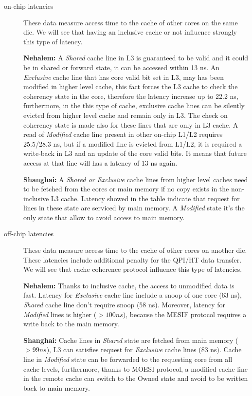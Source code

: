 \begin{description} %

\item[on-chip latencies] These data measure access time to the cache of other cores on the same die. We will see that having an inclusive cache or not
influence strongly this type of latency. 

\textbf{Nehalem:} A \textit{Shared} cache line in L3 is guaranteed to be valid and it could be in shared or forward state, it can be accessed within 13 ns. 
An \textit{Exclusive} cache line that has core valid bit set in L3, may has been modified in higher level cache, this fact forces the L3 cache to check the 
coherency state in the core, therefore the latency increase up to 22.2 ns, furthermore, in the this type of cache, exclusive cache lines can be silently 
evicted from higher level cache and remain only in L3. The check on coherency state is made also for these lines that are only in L3 cache.
A read of \textit{Modified} cache line present in other on-chip L1/L2 requires 25.5/28.3 ns, but if a modified line is evicted from L1/L2, it is required a 
write-back in L3 and an update of the core valid bits. It means that future access at that line will has a latency of 13 ns again.

\textbf{Shanghai:} A \textit{Shared or Exclusive} cache lines from higher level caches need to be fetched from the cores or main memory if no copy exists 
in the non-inclusive L3 cache. Latency showed in the table indicate that request for lines in these state are serviced by main memory.
A \textit{Modified} state it's the only state that allow to avoid access to main memory.

\item[off-chip latencies] These data measure access time to the cache of other cores on another die. These latencies include additional penalty for the
QPI/HT data transfer. We will see that cache coherence protocol influence this type of latencies.

\textbf{Nehalem:} Thanks to inclusive cache, the access to unmodified data is fast. Latency for \textit{Exclusive} cache line include a snoop of one core 
(63 ns), \textit{Shared} cache line don't require snoop (58 ns). Moreover, latency for \textit{Modified} lines is higher ($> 100 ns$), because the MESIF 
protocol requires a write back to the main memory.

\textbf{Shanghai:} Cache lines in \textit{Shared} state are fetched from main memory ($> 99 ns$), L3 can satisfies request for \textit{Exclusive} cache lines 
(83 ns). Cache line in \textit{Modified} state can be forwarded to the requesting core from all cache levels, furthermore, thanks to MOESI protocol, a 
modified cache line in the remote cache can switch to the Owned state and avoid to be written back to main memory.

\end{description} %

